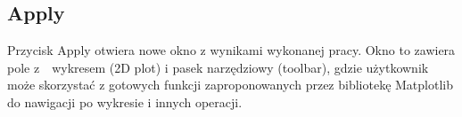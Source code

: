 		\subsection{Apply}		
			Przycisk Apply otwiera nowe okno z wynikami wykonanej pracy. Okno to zawiera pole z~~wykresem (2D plot) i pasek narzędziowy (toolbar), gdzie użytkownik może skorzystać z gotowych funkcji zaproponowanych przez bibliotekę Matplotlib do nawigacji po wykresie i innych operacji. 		
		
		

